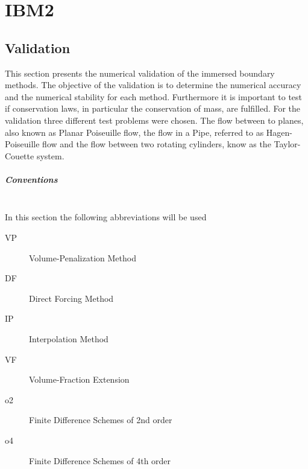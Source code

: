 \chapter{IBM2}
\clearpage
\section{Validation}

This section presents the numerical validation of the immersed boundary methods.
The objective of the validation is to determine the numerical accuracy and
the numerical stability for each method.
Furthermore it is important to test if conservation laws, in particular the conservation of mass,
are fulfilled.
For the validation three different test problems were chosen.
The flow between to planes, also known as Planar Poiseuille flow, the flow in a Pipe, referred to as Hagen-Poiseuille flow and the flow
between two rotating cylinders, know as the Taylor-Couette system.

\paragraph{Conventions}\mbox{}\\

In this section the following abbreviations will be used

\begin{multicols}{2}
\begin{description}
    \item[VP]{Volume-Penalization Method}
    \item[DF]{Direct Forcing Method}
    \item[IP]{Interpolation Method}
    \item[VF]{Volume-Fraction Extension}
    \item[o2]{Finite Difference Schemes of 2nd order}
    \item[o4]{Finite Difference Schemes of 4th order}
\end{description}
\end{multicols}

